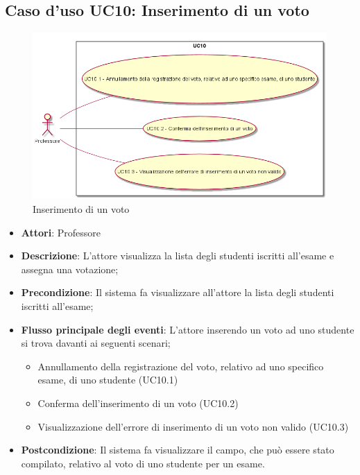 \subsection{Caso d'uso \texorpdfstring{UC10}{UC10}: Inserimento di un voto }
\begin{figure} [H]
\centering
\includegraphics[scale=0.45]{./img/UC10.png}
\caption{Inserimento di un voto }\label{}
\end{figure}
\begin{itemize}
\item \textbf{Attori}: Professore
\item \textbf{Descrizione}: L'attore visualizza la lista degli studenti iscritti all'esame e assegna una votazione;
\item \textbf{Precondizione}: Il sistema fa visualizzare all'attore la lista degli studenti iscritti all'esame;
\item \textbf{Flusso principale degli eventi}: L'attore inserendo un voto ad uno studente si trova davanti ai seguenti scenari;
\begin{itemize}
\item Annullamento della registrazione del voto, relativo ad uno specifico esame, di uno studente (UC10.1)
\item Conferma dell'inserimento di un voto (UC10.2)
\item Visualizzazione dell'errore di inserimento di un voto non valido (UC10.3)
\end{itemize}
\item \textbf{Postcondizione}: Il sistema fa visualizzare il campo, che può essere stato compilato, relativo al voto di uno studente per un esame.
\end{itemize}

